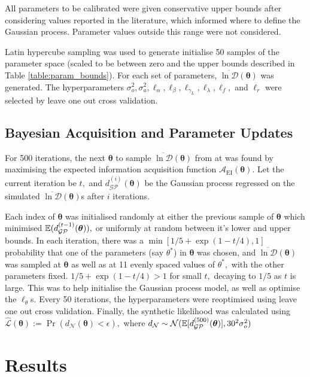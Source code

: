 All parameters to be calibrated were given conservative upper bounds after 
considering values reported in the literature, which informed where to define
the Gaussian process. Parameter values outside this range were not considered.

Latin hypercube sampling was used to generate initialise 50 samples of the 
parameter space (scaled to be between zero and the upper bounds described in 
Table \ref{table:param_bounds}). For each set of parameters, 
$\overline{\ln\mathcal{D}}(\bm{\theta})$ was generated. The hyper\-parameters
$\sigma_o^2, \sigma_a^2, \ell_\alpha, \ell_\beta,
    \ell_{\gamma_L}, \ell_\lambda, \ell_f,$
and $\ell_r$ were selected by leave one out cross validation.

\section{Bayesian Acquisition and Parameter Updates}

For 500 iterations, the next $\bm{\theta}$ to sample 
$\overline{\ln\mathcal{D}}(\bm{\theta})$ from
at was found by maximising the expected information acquisition function
$\mathcal{A}_\text{EI}(\bm{\theta})$. 
Let the current iteration be $t,$ and $d_\mathcal{GP}^{(i)}(\bm{\theta})$ 
be the Gaussian process regressed on the
simulated $\overline{\ln\mathcal{D}}(\bm{\theta})$s after $i$ iterations. 

Each index of $\bm{\theta}$ was initialised randomly at either the 
previous sample of $\bm{\theta}$
which minimised $\operatorname{\mathbb{E}}(d_\mathcal{GP}^{(t-1)}(\bm{\theta})),$ or uniformly at 
random between it's lower and upper bounds. In each iteration, there was a 
$\min\left[1/5 + \exp(1 - t/4), 1 \right]$ probability that one of the
parameters (say $\theta^*$) in $\bm{\theta}$ 
was chosen, and $\overline{\ln\mathcal{D}}(\bm{\theta})$ was sampled at 
$\bm{\theta}$ as well as at 11 evenly spaced values of
$\theta^*,$ with the other parameters fixed.
$1/5 + \exp(1 - t/4)>1$ for small $t,$ decaying to $1/5$ as $t$ is
large. This was to help initialise the Gaussian process model, as well as
optimise the $\ell_\theta$s. Every 50 iterations, the hyperparameters were 
reoptimised using leave one out cross validation. Finally, the synthetic 
likelihood was calculated using 
$\hat{\mathcal{L}}(\bm{\theta}) := \Pr(d_\mathcal{N}(\bm{\theta}) < \epsilon),$ 
where 
$d_\mathcal{N} 
\sim \mathcal{N}(\operatorname{\mathbb{E}}[d_\mathcal{GP}^{(500)}(\bm{\theta})], 30^2\sigma_o^2)$

\chapter{Results}

